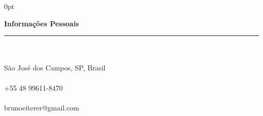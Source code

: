 \documentclass[a4paper]{article}
\begin{document}
\begin{adjustwidth}{\parindent}{0pt}
\begin{minipage}[t]{0.65\textwidth}
\end{minipage} \hspace{0.03\textwidth}
\begin{minipage}[t]{0.25\textwidth}
  \raggedright
  \Large{\textbf{Informações Pessoais}} \normalsize \\ \rule{\textwidth}{0.5pt} \\ \hspace{0pt} \\
   \small{São José dos Campos, SP, Brasil} \\ \hspace{0pt} \\
   \small{+55 48 99611-8470} \\ \hspace{0pt} \\
  \small{brunoeiterer@gmail.com} \\ \hspace{0pt} \\

\end{minipage}
\end{adjustwidth}
\end{document}
